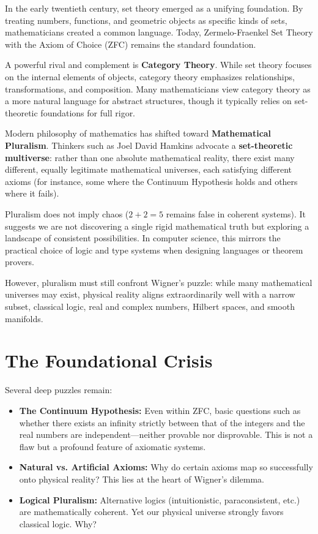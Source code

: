 In the early twentieth century, set theory emerged as a unifying foundation.
By treating numbers, functions, and geometric objects as specific kinds of sets, mathematicians created a common language.
Today, Zermelo-Fraenkel Set Theory with the Axiom of Choice (ZFC) remains the standard foundation.

A powerful rival and complement is \textbf{Category Theory}.
While set theory focuses on the internal elements of objects, category theory emphasizes relationships, transformations, and composition.
Many mathematicians view category theory as a more natural language for abstract structures, though it typically relies on set-theoretic foundations for full rigor.

Modern philosophy of mathematics has shifted toward \textbf{Mathematical Pluralism}.
Thinkers such as Joel David Hamkins advocate a \textbf{set-theoretic multiverse}: rather than one absolute mathematical reality, 
there exist many different, equally legitimate mathematical universes, each satisfying different axioms (for instance, some where the Continuum Hypothesis holds and others where it fails).

Pluralism does not imply chaos ($2+2=5$ remains false in coherent systems).
It suggests we are not discovering a single rigid mathematical truth but exploring a landscape of consistent possibilities.
In computer science, this mirrors the practical choice of logic and type systems when designing languages or theorem provers.

However, pluralism must still confront Wigner's puzzle: while many mathematical universes may exist, physical reality aligns extraordinarily well with a narrow subset, classical logic, real and complex numbers, Hilbert spaces, and smooth manifolds.


\section{The Foundational Crisis}

Several deep puzzles remain:

\begin{itemize}
\item \textbf{The Continuum Hypothesis:} Even within ZFC, basic questions such as whether there exists an infinity strictly between that of the integers and the real numbers are independent---neither provable nor disprovable. This is not a flaw but a profound feature of axiomatic systems.
\item \textbf{Natural vs. Artificial Axioms:} Why do certain axioms map so successfully onto physical reality? This lies at the heart of Wigner's dilemma.
\item \textbf{Logical Pluralism:} Alternative logics (intuitionistic, paraconsistent, etc.) are mathematically coherent. Yet our physical universe strongly favors classical logic. Why?
\end{itemize}

